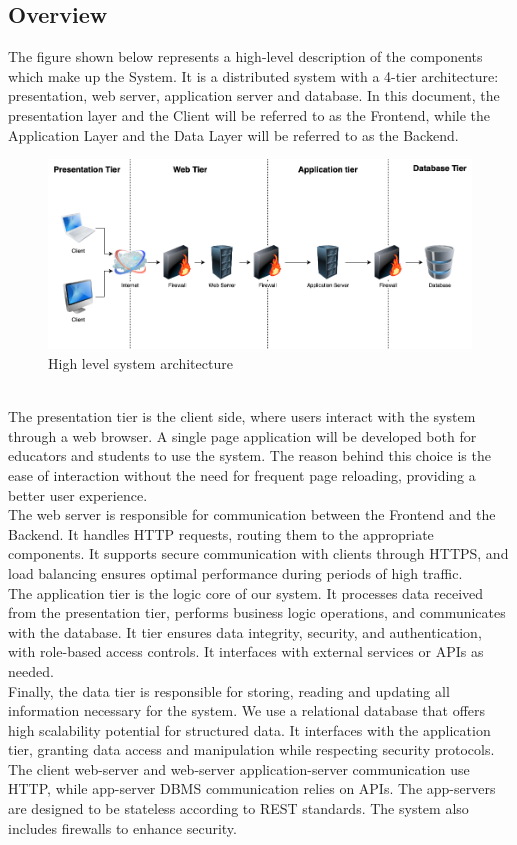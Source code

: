\subsection{Overview}
The figure shown below represents a high-level description of the components which make up the System.
It is a distributed system with a 4-tier architecture: presentation, web server, application server and database. In this document, the presentation layer and the Client will be referred to as the Frontend, while the Application Layer and the Data Layer will be referred to as the Backend.
\\
\begin{figure}[h]
    \center
    \includegraphics[width=1\linewidth]{src/High level system architecture.png}
    \caption{High level system architecture}
    \label{fig:High level system architecture}
\end{figure}
\\
The presentation tier is the client side, where users interact with the system through a web browser. A single page application will be developed both for educators and students to use the system. The reason behind this choice is the ease of interaction without the need for frequent page reloading, providing a better user experience.\\
The web server is responsible for communication between the Frontend and the Backend. It handles HTTP requests, routing them to the appropriate components. It supports secure communication with clients through HTTPS, and load balancing ensures optimal performance during periods of high traffic.\\
The application tier is the logic core of our system. It processes data received from the presentation tier, performs business logic operations, and communicates with the database. It tier ensures data integrity, security, and authentication, with role-based access controls. It interfaces with external services or APIs as needed. \\
Finally, the data tier is responsible for storing, reading and updating all information necessary for the system. We use a relational database that offers high scalability potential for structured data.
It interfaces with the application tier, granting data access and manipulation while respecting security protocols.\\
The client web-server and web-server application-server communication use HTTP, while app-server DBMS communication relies on APIs. The app-servers are designed to be stateless according to REST standards. The system also includes firewalls to enhance security.\\

